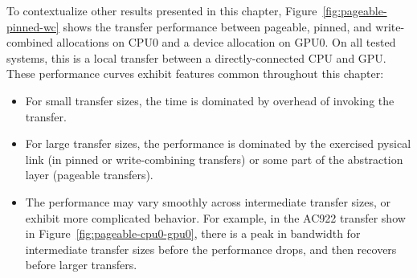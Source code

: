 To contextualize other results presented in this chapter, Figure~\ref{fig:pageable-pinned-wc} shows the transfer performance between pageable, pinned, and write-combined allocations on CPU0 and a device allocation on GPU0.
On all tested systems, this is a local transfer between a directly-connected CPU and GPU.
These performance curves exhibit features common throughout this chapter:
\begin{itemize}
	\item For small transfer sizes, the time is dominated by overhead of invoking the transfer.
	\item For large transfer sizes, the performance is dominated by the exercised pysical link (in pinned or write-combining transfers) or some part of the abstraction layer (pageable transfers).
	\item The performance may vary smoothly across intermediate transfer sizes, or exhibit more complicated behavior.
	For example, in the AC922 transfer show in Figure~\ref{fig:pageable-cpu0-gpu0}, there is a peak in bandwidth for intermediate transfer sizes before the performance drops, and then recovers before larger transfers.
\end{itemize}

